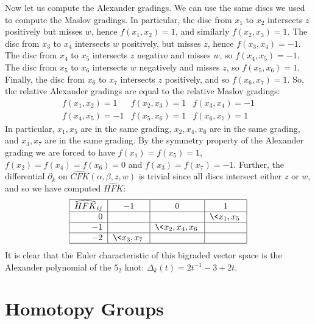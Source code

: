 \begin{example}
Now let us compute the Alexander gradings. We can use the same discs we used to compute the Maslov gradings. In particular, the disc from $x_1$ to $x_2$ intersects $z$ positively but misses $w$, hence $f(x_1,x_2)=1$, and similarly $f(x_2,x_3)=1$. The disc from $x_3$ to $x_4$ intersects $w$ positively, but misses $z$, hence $f(x_3,x_4)=-1$. The disc from $x_4$ to $x_5$ intersects $z$ negative and misses $w$, so $f(x_4,x_5)=-1$. The disc from $x_5$ to $x_6$ intersects $w$ negatively and misses $z$, so $f(x_5,x_6)=1$. Finally, the disc from $x_6$ to $x_7$ intersects $z$ positively, and so $f(x_6,x_7)=1$. So, the relative Alexander gradings are equal to the relative Maslov gradings:
\[
\begin{array}{lll}
f(x_1,x_2) = 1 & f(x_2,x_3) = 1 & f(x_3,x_4) = -1 \\
f(x_4,x_5) = -1 & f(x_5,x_6) = 1 & f(x_6,x_7) = 1 
\end{array}
\]
In particular, $x_1,x_5$ are in the same grading, $x_2,x_4,x_6$ are in the same grading, and $x_3,x_7$ are in the same grading. By the symmetry property of the Alexander grading we are forced to have $f(x_1)=f(x_5)=1$, $f(x_2)=f(x_4)=f(x_6)=0$ and $f(x_3)=f(x_7)=-1$. Further, the differential $\partial_k$ on $\widehat{CFK}(\alpha,\beta,z,w)$ is trivial since all discs intersect either $z$ or $w$, and so we have computed $\widehat{HFK}$:
\[
\begin{tabular}{|r|c|c|c|}
\hline
$\widehat{HFK}_{ij}$ & $-1$ & $0$ & $1$ \\
\hline
$0$ & & & $\<x_1,x_5\>$ \\
\hline
$-1$ & & $\<x_2,x_4,x_6\>$ & \\
\hline
$-2$ & $\<x_3,x_7\>$ & & \\
\hline
\end{tabular}
\]
It is clear that the Euler characteristic of this bigraded vector space is the Alexander polynomial of the $5_2$ knot: $\Delta_k(t) = 2t^{-1}-3+2t$.
\end{example}




















\newpage
\appendix


\section{Homotopy Groups}
\label{Homotopy Groups}


